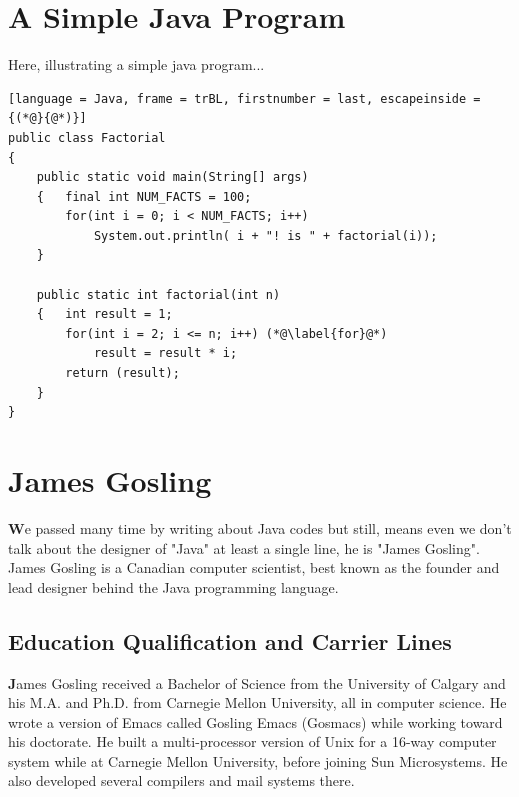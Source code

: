 \documentclass[paper = A5, headinclude, parskip = full, oneside, font = 11 pt]{report}
\begin{document}
\color{green}
\section{A Simple Java Program}
\color{black}
Here, illustrating a simple java program...

\begin{lstlisting}[language = Java, frame = trBL, firstnumber = last, escapeinside = {(*@}{@*)}]
public class Factorial
{
    public static void main(String[] args)
    {   final int NUM_FACTS = 100;
        for(int i = 0; i < NUM_FACTS; i++)
            System.out.println( i + "! is " + factorial(i));
    }

    public static int factorial(int n)
    {   int result = 1;
        for(int i = 2; i <= n; i++) (*@\label{for}@*)
            result = result * i;
        return (result);
    }
}
\end{lstlisting}

\color{green}
\section{James Gosling}
\color{black}
\textbf{W}e passed many time by writing about Java codes but still, means even we don't talk about the designer of "Java" at least a single line, he is "James Gosling".
James Gosling is a Canadian computer scientist, best known as the founder and lead designer behind the Java programming language.

\color{red}
\subsection{Education Qualification and Carrier Lines}
\color{black}
\textbf{J}ames Gosling received a Bachelor of Science from the University of Calgary and his M.A. and Ph.D. from Carnegie Mellon University, all in computer science. He wrote a version of Emacs called Gosling Emacs (Gosmacs) while working toward his doctorate. He built a multi-processor version of Unix for a 16-way computer system while at Carnegie Mellon University, before joining Sun Microsystems. He also developed several compilers and mail systems there.
\end{document}
